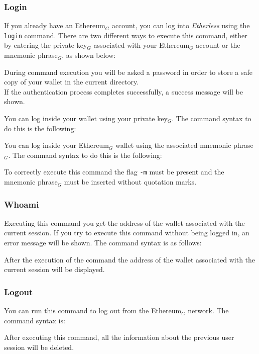 \subsubsection{Login}
If you already have an Ethereum$_{G}$ account, you can log into \textit{Etherless} using the \texttt{login} command. There are two different ways to execute this command, either by entering the private key$_{G}$ associated with your Ethereum$_{G}$ account or the mnemonic phrase$_{G}$, as shown below: \\
\begin{center}
\end{center}
During command execution you will be asked a password in order to store a safe copy of your wallet in the current directory. \\
If the authentication process completes successfully, a success message will be shown.

You can log inside your wallet using your private key$_{G}$. The command syntax to do this is the following:
\begin{center}
\end{center}

You can log inside your Ethereum$_{G}$ wallet using the associated mnemonic phrase$_{G}$. The command syntax to do this is the following:
\begin{center}
\end{center}
To correctly execute this command the flag \texttt{-m} must be present and the mnemonic phrase$_{G}$ must be inserted without quotation marks.

\subsubsection{Whoami}
Executing this command you get the address of the wallet associated with the current session. If you try to execute this command without being logged in, an error message will be shown. The command syntax is as follows: 
\begin{center}
\end{center}
After the execution of the command the address of the wallet associated with the current session will be displayed.

\subsubsection{Logout}
You can run this command to log out from the Ethereum$_{G}$ network. The command syntax is:
\begin{center}
\end{center}
After executing this command, all the information about the previous user session will be deleted.

